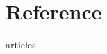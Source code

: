 \chapter*{Reference}  %
    \begingroup  
    \let\chapter\section 
    \makeatletter\let\markboth\@firstoftwo\makeatother 
    \pagestyle{plain}



	
    \begin{flushleft}


    \begin{btSect}{articles}
        \btPrintCited
    \end{btSect}


	\end{flushleft}
    \pagestyle{fancy}
\endgroup

